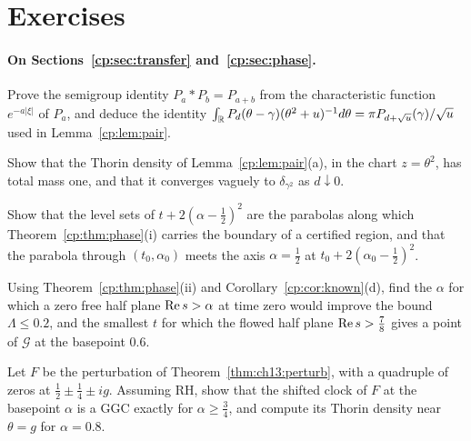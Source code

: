 \section{Exercises}\label{chap:phase:ex}

\paragraph{On Sections~\ref{cp:sec:transfer} and~\ref{cp:sec:phase}.}
\begin{exercises}
\item\label{ex:cp:cauchy} Prove the semigroup identity $P_a*P_b=P_{a+b}$ from the characteristic function $e^{-a|\xi|}$ of $P_a$, and deduce the identity $\int_{\mathbb{R}} P_d(\theta-\gamma)(\theta^2+u)^{-1}d\theta=\pi P_{d+\sqrt u}(\gamma)/\sqrt u$ used in Lemma~\ref{cp:lem:pair}.
\item Show that the Thorin density of Lemma~\ref{cp:lem:pair}(a), in the chart $z=\theta^2$, has total mass one, and that it converges vaguely to $\delta_{\gamma^2}$ as $d\downarrow0$.
\item\label{ex:cp:level} Show that the level sets of $t+2(\alpha-\frac12)^2$ are the parabolas along which Theorem~\ref{cp:thm:phase}(i) carries the boundary of a certified region, and that the parabola through $(t_0,\alpha_0)$ meets the axis $\alpha=\frac12$ at $t_0+2(\alpha_0-\frac12)^2$.
\item Using Theorem~\ref{cp:thm:phase}(ii) and Corollary~\ref{cp:cor:known}(d), find the $\alpha$ for which a zero free half plane $\operatorname{Re} s>\alpha$ at time zero would improve the bound $\Lambda\le0.2$, and the smallest $t$ for which the flowed half plane $\operatorname{Re} s>\frac78$ gives a point of $\mathcal G$ at the basepoint $0.6$.
\item Let $F$ be the perturbation of Theorem~\ref{thm:ch13:perturb}, with a quadruple of zeros at $\frac12\pm\frac14\pm ig$. Assuming RH, show that the shifted clock of $F$ at the basepoint $\alpha$ is a GGC exactly for $\alpha\ge\frac34$, and compute its Thorin density near $\theta=g$ for $\alpha=0.8$.
\end{exercises}

